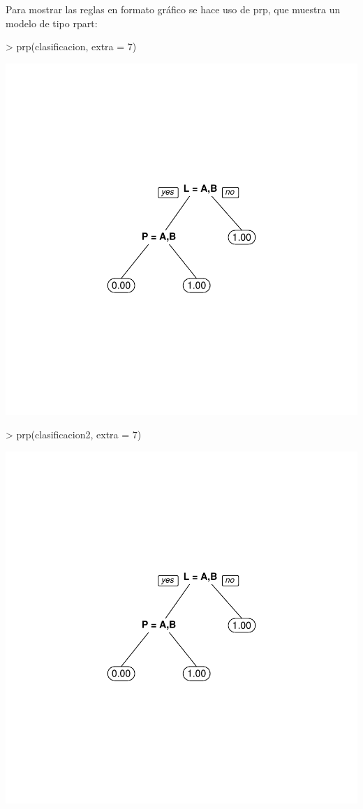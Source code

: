 \documentclass [a4paper] {article}
\begin{document}
\newpage
Para mostrar las reglas en formato gráfico se hace uso de prp, que muestra un modelo de tipo rpart:

\begin{Schunk}
\begin{Sinput}
> prp(clasificacion, extra = 7)
\end{Sinput}
\end{Schunk}
\includegraphics{Memoria-Figura 5}

\newpage
\begin{Schunk}
\begin{Sinput}
> prp(clasificacion2, extra = 7)
\end{Sinput}
\end{Schunk}
\includegraphics{Memoria-Figura 6}
\end{document}
